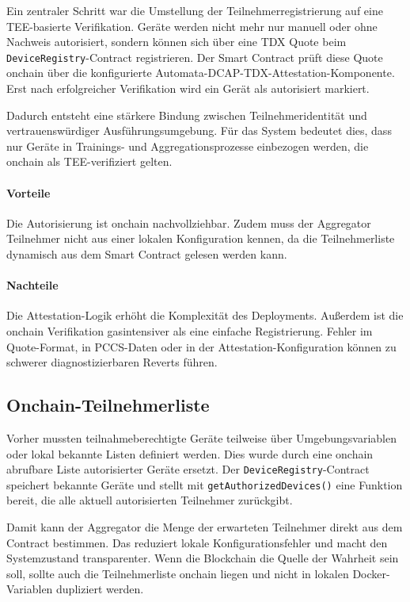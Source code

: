Ein zentraler Schritt war die Umstellung der Teilnehmerregistrierung auf eine TEE-basierte Verifikation. Geräte werden nicht mehr nur manuell oder ohne Nachweis autorisiert, sondern können sich über eine TDX Quote beim \texttt{DeviceRegistry}-Contract registrieren. Der Smart Contract prüft diese Quote onchain über die konfigurierte Automata-DCAP-TDX-Attestation-Komponente. Erst nach erfolgreicher Verifikation wird ein Gerät als autorisiert markiert.

Dadurch entsteht eine stärkere Bindung zwischen Teilnehmeridentität und vertrauenswürdiger Ausführungsumgebung. Für das System bedeutet dies, dass nur Geräte in Trainings- und Aggregationsprozesse einbezogen werden, die onchain als TEE-verifiziert gelten.

\paragraph{Vorteile}
Die Autorisierung ist onchain nachvollziehbar. Zudem muss der Aggregator Teilnehmer nicht aus einer lokalen Konfiguration kennen, da die Teilnehmerliste dynamisch aus dem Smart Contract gelesen werden kann.

\paragraph{Nachteile}
Die Attestation-Logik erhöht die Komplexität des Deployments. Außerdem ist die onchain Verifikation gasintensiver als eine einfache Registrierung. Fehler im Quote-Format, in PCCS-Daten oder in der Attestation-Konfiguration können zu schwerer diagnostizierbaren Reverts führen.

\subsection{Onchain-Teilnehmerliste}

Vorher mussten teilnahmeberechtigte Geräte teilweise über Umgebungsvariablen oder lokal bekannte Listen definiert werden. Dies wurde durch eine onchain abrufbare Liste autorisierter Geräte ersetzt. Der \texttt{DeviceRegistry}-Contract speichert bekannte Geräte und stellt mit \texttt{getAuthorizedDevices()} eine Funktion bereit, die alle aktuell autorisierten Teilnehmer zurückgibt.

Damit kann der Aggregator die Menge der erwarteten Teilnehmer direkt aus dem Contract bestimmen. Das reduziert lokale Konfigurationsfehler und macht den Systemzustand transparenter. Wenn die Blockchain die Quelle der Wahrheit sein soll, sollte auch die Teilnehmerliste onchain liegen und nicht in lokalen Docker-Variablen dupliziert werden.

